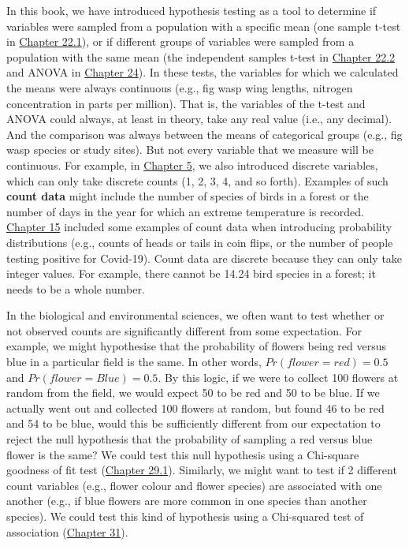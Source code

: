 \documentclass[
  openany]{scrbook}
\begin{document}
In this book, we have introduced hypothesis testing as a tool to determine if variables were sampled from a population with a specific mean (one sample t-test in \protect\hyperlink{one-sample-t-test}{Chapter 22.1}), or if different groups of variables were sampled from a population with the same mean (the independent samples t-test in \protect\hyperlink{independent-samples-t-test}{Chapter 22.2} and ANOVA in \protect\hyperlink{Chapter_24}{Chapter 24}).
In these tests, the variables for which we calculated the means were always continuous (e.g., fig wasp wing lengths, nitrogen concentration in parts per million).
That is, the variables of the t-test and ANOVA could always, at least in theory, take any real value (i.e., any decimal).
And the comparison was always between the means of categorical groups (e.g., fig wasp species or study sites).
But not every variable that we measure will be continuous.
For example, in \protect\hyperlink{Chapter_5}{Chapter 5}, we also introduced discrete variables, which can only take discrete counts (1, 2, 3, 4, and so forth).
Examples of such \textbf{count data} might include the number of species of birds in a forest or the number of days in the year for which an extreme temperature is recorded.
\protect\hyperlink{Chapter_15}{Chapter 15} included some examples of count data when introducing probability distributions (e.g., counts of heads or tails in coin flips, or the number of people testing positive for Covid-19).
Count data are discrete because they can only take integer values.
For example, there cannot be 14.24 bird species in a forest; it needs to be a whole number.

In the biological and environmental sciences, we often want to test whether or not observed counts are significantly different from some expectation.
For example, we might hypothesise that the probability of flowers being red versus blue in a particular field is the same.
In other words, \(Pr(flower = red) = 0.5\) and \(Pr(flower = Blue) = 0.5\).
By this logic, if we were to collect 100 flowers at random from the field, we would expect 50 to be red and 50 to be blue.
If we actually went out and collected 100 flowers at random, but found 46 to be red and 54 to be blue, would this be sufficiently different from our expectation to reject the null hypothesis that the probability of sampling a red versus blue flower is the same?
We could test this null hypothesis using a Chi-square goodness of fit test (\protect\hyperlink{the-chi-square-distribution}{Chapter 29.1}).
Similarly, we might want to test if 2 different count variables (e.g., flower colour and flower species) are associated with one another (e.g., if blue flowers are more common in one species than another species).
We could test this kind of hypothesis using a Chi-squared test of association (\protect\hyperlink{Chapter_31}{Chapter 31}).
\end{document}
